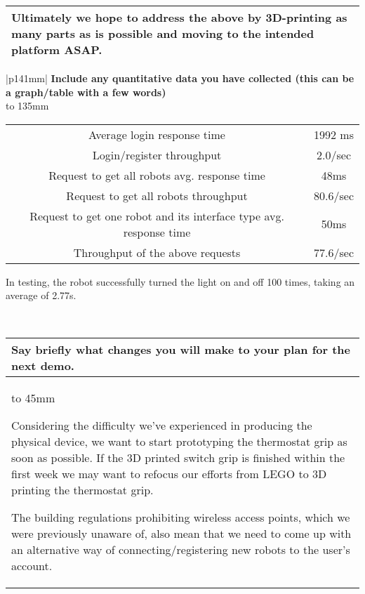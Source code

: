 \documentclass[a4paper]{article}
\newcommand{\colWidth}{141mm}
\begin{document}
\begin{center}
\begin{tabular}{|p{\colWidth}|}
{		\vspace{2.5mm}

		Ultimately we hope to address the above by 3D-printing as many parts as is possible and moving to the intended platform ASAP.
  }
  \\
  \hline
\end{tabular}
\vskip 5mm


\begin{tabular}{|p{\colWidth}|}
	\hline
	\large
	\textbf{Include any quantitative data you have collected (this can be a graph/table with a few words)}
	\\ \hline
	\vtop to 135mm{
		\begin{tabular}{ c | c }
			Average login response time & 1992 ms \\
			Login/register throughput & 2.0/sec \\
			Request to get all robots avg. response time & 48ms \\
			Request to get all robots throughput & 80.6/sec \\
			Request to get one robot and its interface type avg. response time & 50ms \\
			Throughput of the above requests & 77.6/sec
		\end{tabular}

		In testing, the robot successfully turned the light on and off 100 times, taking an average of 2.77s.

  }
  \\
  \hline
\end{tabular}
\vskip 5mm


\begin{tabular}{|p{\colWidth}|}
	\hline
	\cellcolor{blue!25}\large
	\textbf{Say briefly what changes you will make to your plan for the next demo.}
	\\ \hline
	\vtop to 45mm{
		Considering the difficulty we've experienced in producing the physical device, we want to start prototyping the thermostat grip as soon as possible. If the 3D printed switch grip is finished within the first week we may want to refocus our efforts from LEGO to 3D printing the thermostat grip.

		\vspace{2.5mm}

		The building regulations prohibiting wireless access points, which we were previously unaware of, also mean that we need to come up with an alternative way of connecting/registering new robots to the user's account.
  	}
  \\
  \hline
\end{tabular}

\end{center}
  
\end{document}
